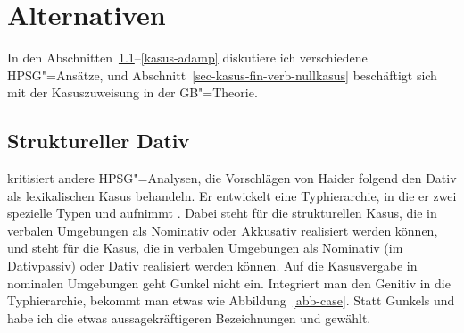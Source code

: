 {}




\section{Alternativen}
\label{sec-kasus-alternativen}

In den Abschnitten~\ref{sec-alternativen-struc-dativ}--\ref{kasus-adamp} diskutiere ich verschiedene HPSG"=Ansätze,
und Abschnitt~\ref{sec-kasus-fin-verb-nullkasus} beschäftigt sich mit der Kasuszuweisung in der GB"=Theorie.

\subsection{Struktureller Dativ}
\label{sec-alternativen-struc-dativ}

\citet[]{Gunkel2003b} kritisiert andere HPSG"=Analysen, die Vorschlägen von Haider folgend
den Dativ als lexikalischen Kasus behandeln. Er entwickelt eine Typhierarchie,
in die er zwei spezielle Typen  und  aufnimmt \citep[96]{Gunkel2003b}. Dabei steht 
für die strukturellen Kasus, die in verbalen Umgebungen als Nominativ oder Akkusativ realisiert
werden können, und  steht für die Kasus, die in verbalen Umgebungen als Nominativ (im Dativpassiv)
oder Dativ realisiert werden können. Auf die Kasusvergabe in nominalen Umgebungen geht Gunkel
nicht ein. Integriert man den Genitiv in die Typhierarchie, bekommt man etwas
wie Abbildung~\vref{abb-case}. Statt Gunkels  und  habe ich
die etwas aussagekräftigeren Bezeichnungen  und 
gewählt.

